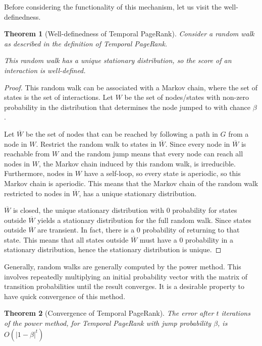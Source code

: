\documentclass[a4paper,11pt]{book}
\newcommand{\ov}{\overline}
\newtheorem{theorem}{Theorem}
\theoremstyle{definition}
\begin{document}
Before considering the functionality of this mechanism, let us visit the well-definedness.

\begin{theorem}[Well-definedness of Temporal PageRank]
    Consider a random walk as described in the definition of Temporal PageRank.

    This random walk has a unique stationary distribution, so the score of an interaction is well-defined.
    \label{thm:well_defined}
\end{theorem}
\begin{proof}
    This random walk can be associated with a Markov chain, where the set of states is the set of
    interactions. Let $W$ be the set of nodes/states with non-zero probability in the distribution
    that determines the node jumped to with chance $\beta$.

    Let $\ov{W}$ be the set of nodes that can be reached by following a path in $G$ from a node
    in $W$. Restrict the random walk to states in $\ov{W}$. Since every node in $\ov{W}$ is reachable
    from $W$ and the random jump means that every node can reach all nodes in $W$, the Markov chain
    induced by this random walk, is irreducible. Furthermore, nodes in $W$ have a self-loop, so every
    state is aperiodic, so this Markov chain is aperiodic. This means that the Markov chain of the
    random walk restricted to nodes in $\ov{W}$, has a unique stationary distribution.

    $\ov{W}$ is closed, the unique stationary distribution with $0$ probability for states outside
    $\ov{W}$ yields a stationary distribution for the full random walk. Since states
    outside $\ov{W}$ are transient. In fact, there is a $0$ probability of returning to that
    state. This means that all states outside $\ov{W}$ must have a $0$ probability in a stationary
    distribution, hence the stationary distribution is unique.
\end{proof}

Generally, random walks are generally computed by the power method. This involves repeatedly
multiplying an initial probability vector with the matrix of transition probabilities until
the result converges. It is a desirable property to have quick convergence of this method.

\begin{theorem}[Convergence of Temporal PageRank]
    The error after $t$ iterations of the power method, for Temporal PageRank with
    jump probability $\beta$, is $O(|1-\beta|^t)$
    \label{}
\end{theorem}
\end{document}
